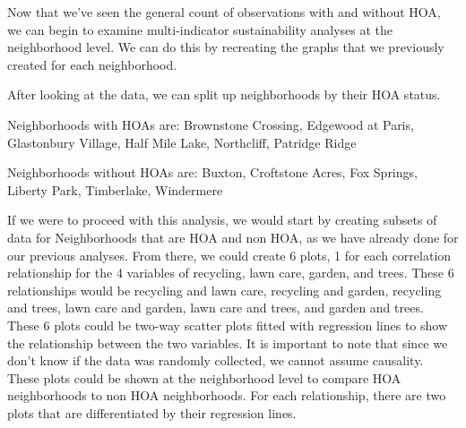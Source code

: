 \documentclass{article}
\begin{document}
Now that we've seen the general count of observations with and without HOA, we can begin to examine multi-indicator sustainability analyses at the neighborhood level. We can do this by recreating the graphs that we previously created for each neighborhood. 
\newline

After looking at the data, we can split up neighborhoods by their HOA status.


Neighborhoods with HOAs are: Brownstone Crossing, Edgewood at Paris, Glastonbury Village, Half Mile Lake, Northcliff, Patridge Ridge


Neighborhoods without HOAs are: Buxton, Croftstone Acres, Fox Springs, Liberty Park, Timberlake, Windermere
\newline

If we were to proceed with this analysis, we would start by creating subsets of data for Neighborhoods that are HOA and non HOA, as we have already done for our previous analyses. From there, we could create 6 plots, 1 for each correlation relationship for the 4 variables of recycling, lawn care, garden, and trees. 
\newline
These 6 relationships would be recycling and lawn care, recycling and garden, recycling and trees, lawn care and garden, lawn care and trees, and garden and trees. These 6 plots could be two-way scatter plots fitted with regression lines to show the relationship between the two variables. It is important to note that since we don't know if the data was randomly collected, we cannot assume causality. These plots could be shown at the neighborhood level to compare HOA neighborhoods to non HOA neighborhoods. For each relationship, there are two plots that are differentiated by their regression lines. 
\newpage
\end{document}
